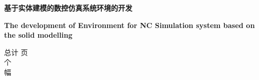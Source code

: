 \newpage\thispagestyle{empty}	
	\vskip 2cm
	\centering

         {\songti  \bfseries {} 基于实体建模的数控仿真系统环境的开发  } %
         \vskip 0.5cm
        \vskip 2.5cm

        { \bfseries \Large The development of Environment for NC Simulation system  based on the solid modelling}%
        \vskip 13cm
   \begin{flushleft}
        \songti{}
        总计  \underline{} 页\\
       \quad \quad {}  \underline{} 个\\
        \quad \quad {}  \underline{}幅\\
   \end{flushleft}
